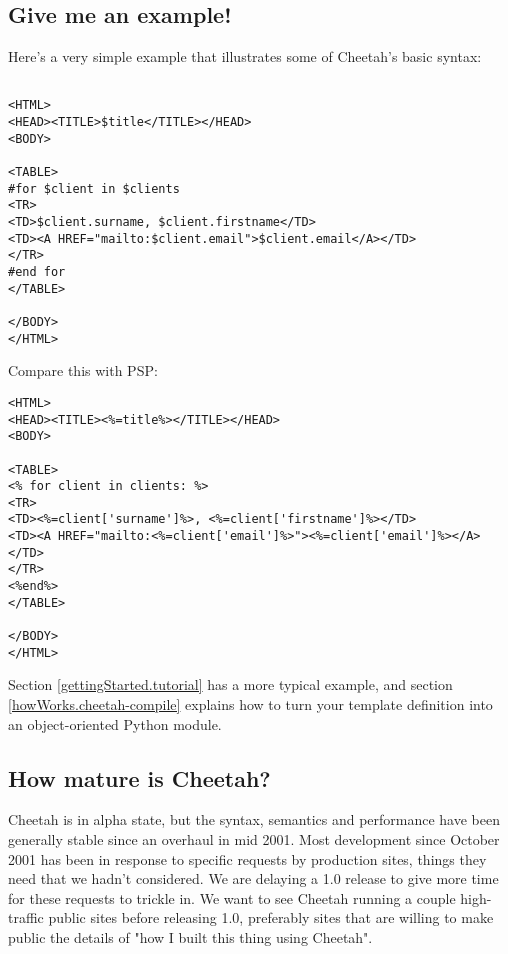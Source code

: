 \subsection{Give me an example!}
\label{intro.example}

Here's a very simple example that illustrates some of Cheetah's basic syntax:

\begin{verbatim}

<HTML>
<HEAD><TITLE>$title</TITLE></HEAD>
<BODY>

<TABLE>
#for $client in $clients
<TR>
<TD>$client.surname, $client.firstname</TD>
<TD><A HREF="mailto:$client.email">$client.email</A></TD>
</TR>
#end for
</TABLE>

</BODY>
</HTML>
\end{verbatim}

Compare this with PSP:

\begin{verbatim}
<HTML>
<HEAD><TITLE><%=title%></TITLE></HEAD>
<BODY>

<TABLE>
<% for client in clients: %>
<TR>
<TD><%=client['surname']%>, <%=client['firstname']%></TD>
<TD><A HREF="mailto:<%=client['email']%>"><%=client['email']%></A></TD>
</TR>
<%end%>
</TABLE>

</BODY>
</HTML>
\end{verbatim}

Section \ref{gettingStarted.tutorial} has a more typical example, and section
\ref{howWorks.cheetah-compile} explains how to turn your template definition
into an object-oriented Python module.


\subsection{How mature is Cheetah?}
\label{intro.mature}

Cheetah is in alpha state, but the syntax, semantics and performance have been
generally stable since an overhaul in mid 2001.  Most development since
October 2001 has been in response to specific requests by production sites,
things they need that we hadn't considered.  We are delaying a 1.0 release to
give more time for these requests to trickle in.  We want to see Cheetah running
a couple high-traffic public sites before releasing 1.0, preferably sites that
are willing to make public the details of "how I built this thing using
Cheetah".

